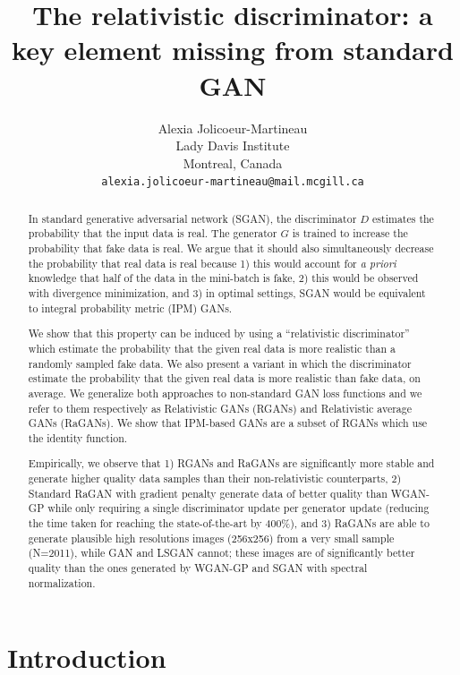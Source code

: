 \documentclass{article}
\title{The relativistic discriminator: a key element missing from standard GAN}
\author{
  Alexia Jolicoeur-Martineau \\
  Lady Davis Institute\\
  Montreal, Canada\\
  \texttt{alexia.jolicoeur-martineau@mail.mcgill.ca} \\
}
\begin{document}

\maketitle

\begin{abstract}
	
	In standard generative adversarial network (SGAN), the discriminator $D$ estimates the probability that the input data is real. The generator $G$ is trained to increase the probability that fake data is real. We argue that it should also simultaneously decrease the probability that real data is real because 1) this would account for \textit{a priori} knowledge that half of the data in the mini-batch is fake, 2) this would be observed with divergence minimization, and 3) in optimal settings, SGAN would be equivalent to integral probability metric (IPM) GANs. 

	We show that this property can be induced by using a “relativistic discriminator” which estimate the probability that the given real data is more realistic than a randomly sampled fake data. We also present a variant in which the discriminator estimate the probability that the given real data is more realistic than fake data, on average. We generalize both approaches to non-standard GAN loss functions and we refer to them respectively as Relativistic GANs (RGANs) and Relativistic average GANs (RaGANs). We show that IPM-based GANs are a subset of RGANs which use the identity function.
	
	Empirically, we observe that 1) RGANs and RaGANs are significantly more stable and generate higher quality data samples than their non-relativistic counterparts, 2) Standard RaGAN with gradient penalty generate data of better quality than WGAN-GP while only requiring a single discriminator update per generator update (reducing the time taken for reaching the state-of-the-art by 400\%), and 3) RaGANs are able to generate plausible high resolutions images (256x256) from a very small sample (N=2011), while GAN and LSGAN cannot; these images are of significantly better quality than the ones generated by WGAN-GP and SGAN with spectral normalization. 

\end{abstract}

\section{Introduction}
\end{document}

